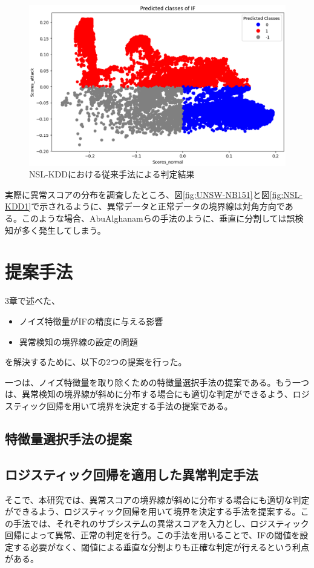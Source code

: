 \documentclass{css}
\begin{document}
\begin{figure}[ht]
    \centering
    \includegraphics[width=\linewidth]{pictures/eps/NSL-KDD2.eps}
    \caption{NSL-KDDにおける従来手法による判定結果}
    \label{fig:NSL-KDD2}
\end{figure}

実際に異常スコアの分布を調査したところ、図\ref{fig:UNSW-NB151}と図\ref{fig:NSL-KDD1}で示されるように、異常データと正常データの境界線は対角方向である。このような場合、AbuAlghanamらの手法\cite{AbuAlghanam2023-sx}のように、垂直に分割しては誤検知が多く発生してしまう。

\section{提案手法}
3章で述べた、
\begin{itemize}
    \item ノイズ特徴量がIFの精度に与える影響
    \item 異常検知の境界線の設定の問題
\end{itemize}
を解決するために、以下の2つの提案を行った。

一つは、ノイズ特徴量を取り除くための特徴量選択手法の提案である。もう一つは、異常検知の境界線が斜めに分布する場合にも適切な判定ができるよう、ロジスティック回帰を用いて境界を決定する手法の提案である。

\subsection{特徴量選択手法の提案}   



\subsection{ロジスティック回帰を適用した異常判定手法}
そこで、本研究では、異常スコアの境界線が斜めに分布する場合にも適切な判定ができるよう、ロジスティック回帰を用いて境界を決定する手法を提案する。この手法では、それぞれのサブシステムの異常スコアを入力とし、ロジスティック回帰によって異常、正常の判定を行う。この手法を用いることで、IFの閾値を設定する必要がなく、閾値による垂直な分割よりも正確な判定が行えるという利点がある。
\end{document}
